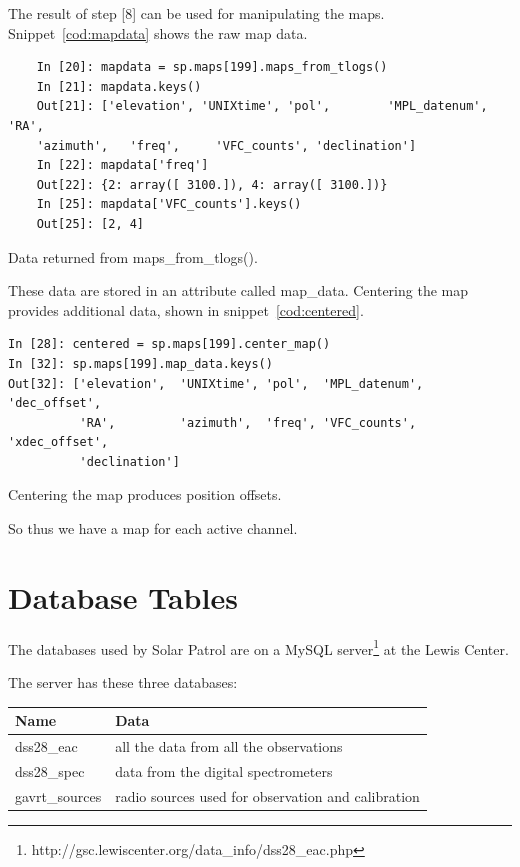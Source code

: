 \documentclass[letterpaper,11pt]{report}
\begin{document}
The result of step [8] can be used for manipulating the maps. 
Snippet~\ref{cod:mapdata} shows the raw map data.
\begin{code}[h!tb]
    \begin{center}
{\scriptsize \begin{verbatim}
    In [20]: mapdata = sp.maps[199].maps_from_tlogs()
    In [21]: mapdata.keys()
    Out[21]: ['elevation', 'UNIXtime', 'pol',        'MPL_datenum', 'RA',
    'azimuth',   'freq',     'VFC_counts', 'declination']
    In [22]: mapdata['freq']
    Out[22]: {2: array([ 3100.]), 4: array([ 3100.])}
    In [25]: mapdata['VFC_counts'].keys()
    Out[25]: [2, 4]\end{verbatim}
        }\caption{\label{cod:mapdata}Data returned from {\ttfamily maps\_from\_tlogs()}.}
    \end{center}
\end{code}
These data are stored in an attribute called {\ttfamily map\_data}.
Centering the map provides additional data, shown in 
snippet~\ref{cod:centered}.
\begin{code}[h!tb]
    \begin{center}
        {\scriptsize \begin{verbatim}
In [28]: centered = sp.maps[199].center_map()
In [32]: sp.maps[199].map_data.keys()
Out[32]: ['elevation',  'UNIXtime', 'pol',  'MPL_datenum', 'dec_offset',
          'RA',         'azimuth',  'freq', 'VFC_counts',  'xdec_offset',
          'declination']\end{verbatim}
        }\caption{\label{cod:centered}Centering the map produces position
        offsets.}
    \end{center}
\end{code}
So thus we have a map for each active channel.

\appendix

\chapter{Database Tables}\label{ch:dbtables}

The databases used by Solar Patrol are on a MySQL
server\footnote{\ttfamily http://gsc.lewiscenter.org/data\_info/dss28\_eac.php}
at the Lewis Center.

The server has these three databases:
\begin{center}
    \begin{tabular}{l|l}
        \hline
        Name                        & Data \\
        \hline
        {\ttfamily dss28\_eac}      &  all the data from all the observations \\
        {\ttfamily dss28\_spec}     &  data from the digital spectrometers \\
        {\ttfamily gavrt\_sources}  &  radio sources used for observation and calibration \\
        \hline
    \end{tabular}
\end{center}
\end{document}
